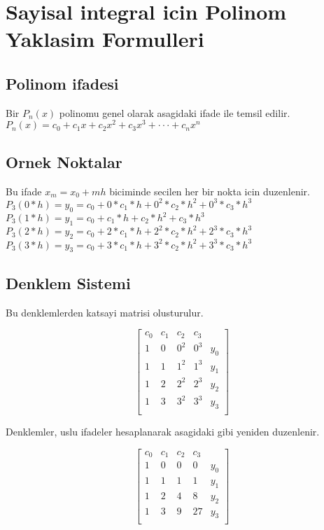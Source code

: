 \documentclass{article}
\begin{document}
\setlength\parindent{0pt}
\section{Sayisal integral icin Polinom Yaklasim Formulleri}
\subsection{Polinom ifadesi}
Bir $P_{n}(x)$ polinomu genel olarak asagidaki ifade ile temsil edilir.\\
$\displaystyle P_{n}(x)= c_{0}+c_{1}x+c_{2}x^{2}+c_{3}x^{3}+\cdot\cdot\cdot+c_{n}x^{n}$
\subsection{Ornek Noktalar}
Bu ifade $x_{m}=x_{0}+mh$ biciminde secilen her bir nokta icin duzenlenir.\\
$\displaystyle P_{3}(0*h)=y_{0}=c_{0}+0*c_{1}*h+0^{2}*c_{2}*h^{2}+0^{3}*c_{3}*h^{3}$\\
$\displaystyle P_{3}(1*h)=y_{1}=c_{0}+c_{1}*h+c_{2}*h^{2}+c_{3}*h^{3}$\\
$\displaystyle P_{3}(2*h)=y_{2}=c_{0}+2*c_{1}*h+2^{2}*c_{2}*h^{2}+2^{3}*c_{3}*h^{3}$\\
$\displaystyle P_{3}(3*h)=y_{3}=c_{0}+3*c_{1}*h+3^{2}*c_{2}*h^{2}+3^{3}*c_{3}*h^{3}$\\
\subsection{Denklem Sistemi}
Bu denklemlerden katsayi matrisi olusturulur.
\begin{center}
$$ \left[\begin{array}{rrrr|r}
c_{0} & c_{1} & c_{2} & c_{3}\\
1 & 0 & 0^{2} & 0^{3} & y_{0}\\
1 & 1 & 1^{2} & 1^{3} & y_{1}\\
1 & 2 & 2^{2} & 2^{3} & y_{2}\\
1 & 3 & 3^{2} & 3^{3} & y_{3}\\
\end{array}\right] $$
\end{center}
Denklemler, uslu ifadeler hesaplanarak asagidaki gibi yeniden duzenlenir.
\begin{center}
$$ \left[\begin{array}{rrrr|r}
c_{0} & c_{1} & c_{2} & c_{3}\\
1 & 0 & 0 & 0 & y_{0}\\
1 & 1 & 1 & 1 & y_{1}\\
1 & 2 & 4 & 8 & y_{2}\\
1 & 3 & 9 & 27 & y_{3}\\
\end{array}\right] $$
\end{center}
\end{document}
